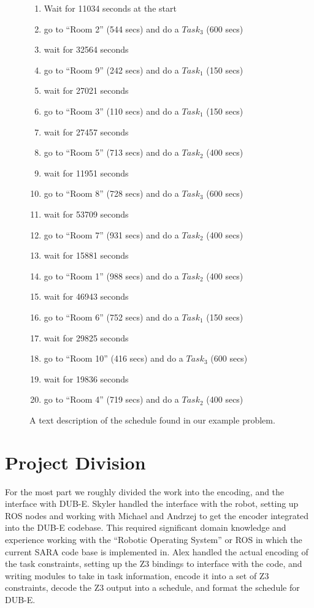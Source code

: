\documentclass[11pt]{article}
\begin{document}
\begin{figure}
  \begin{enumerate}
    \item Wait for 11034 seconds at the start
    \item go to ``Room 2'' (544 secs) and do a $Task_3$ (600 secs)
    \item wait for 32564 seconds
    \item go to ``Room 9'' (242 secs) and do a $Task_1$ (150 secs)
    \item wait for 27021 seconds
    \item go to ``Room 3'' (110 secs) and do a $Task_1$ (150 secs)
    \item wait for 27457 seconds
    \item go to ``Room 5'' (713 secs) and do a $Task_2$ (400 secs)
    \item wait for 11951 seconds
    \item go to ``Room 8'' (728 secs) and do a $Task_3$ (600 secs)
    \item wait for 53709 seconds
    \item go to ``Room 7'' (931 secs) and do a $Task_2$ (400 secs)
    \item wait for 15881 seconds
    \item go to ``Room 1'' (988 secs) and do a $Task_2$ (400 secs)
    \item wait for 46943 seconds
    \item go to ``Room 6'' (752 secs) and do a $Task_1$ (150 secs)
    \item wait for 29825 seconds
    \item go to ``Room 10'' (416 secs) and do a $Task_3$ (600 secs)
    \item wait for 19836 seconds
    \item go to ``Room 4'' (719 secs) and do a $Task_2$ (400 secs)
  \end{enumerate}
  \caption{
    A text description of the schedule found in our example problem.
  }
  \label{fig:text-schedule}
\end{figure}

\section{Project Division}
For the most part we roughly divided the work into the encoding,
and the interface with DUB-E.
Skyler handled the interface with the robot,
setting up ROS nodes and working with Michael and Andrzej
to get the encoder integrated
into the DUB-E codebase. This required significant
domain knowledge and experience working with the
``Robotic Operating System'' or ROS in which the
current SARA code base is implemented in.
Alex handled the actual encoding of the task constraints,
setting up the Z3 bindings to interface with the code,
and writing modules to take in task information,
encode it into a set of Z3 constraints,
decode the Z3 output into a schedule,
and format the schedule for DUB-E.
\end{document}
